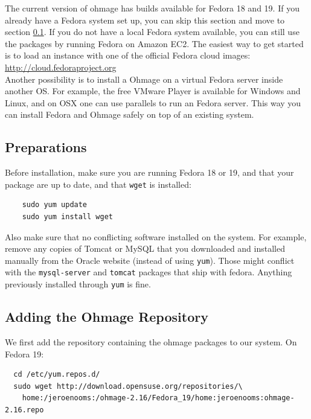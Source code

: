 \documentclass{scrartcl}
\begin{document}
The current version of ohmage has builds available for Fedora 18 and 19.
If you already have a Fedora system set up, you can skip this section and
move to section \ref{preparations}.
If you do not have a local Fedora system available, you can still use
the packages by running Fedora on Amazon EC2. The easiest way to get started is
to load an instance with one of the official Fedora cloud images: \\

\url{http://cloud.fedoraproject.org} \\

\noindent Another possibility is to install a Ohmage on a virtual Fedora server
inside another OS. For example, the free VMware Player is available for Windows 
and Linux, and on OSX one can use parallels to run an Fedora server. This way
you can install Fedora and Ohmage safely on top of an existing system.

\subsection{Preparations}
\label{preparations}

Before installation, make sure you are running Fedora 18 or 19, and that your
package are up to date, and that \texttt{wget} is installed:

\begin{verbatim}
    sudo yum update
    sudo yum install wget
\end{verbatim}

\noindent Also make sure that no conflicting software installed on the system.
For example, remove any copies of Tomcat or MySQL that you downloaded and
installed manually from the Oracle website (instead of using \texttt{yum}).
Those might conflict with the \texttt{mysql-server} and \texttt{tomcat}
packages that ship with fedora. Anything previously installed through
\texttt{yum} is fine.

\subsection{Adding the Ohmage Repository}

We first add the repository containing the ohmage packages to our system. On
Fedora 19:

\begin{verbatim}
  cd /etc/yum.repos.d/
  sudo wget http://download.opensuse.org/repositories/\
    home:/jeroenooms:/ohmage-2.16/Fedora_19/home:jeroenooms:ohmage-2.16.repo
\end{verbatim}
\end{document}
